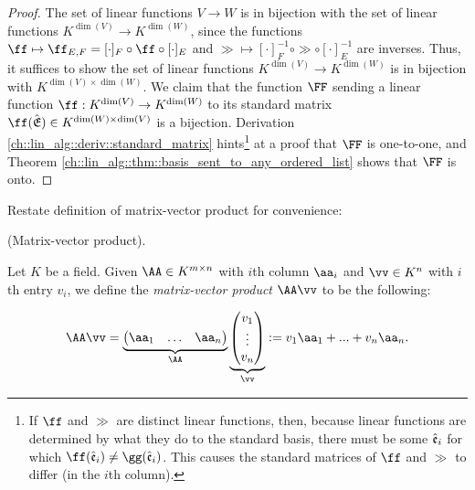 \begin{proof}
   The set of linear functions $V \rightarrow W$ is in bijection with the set of linear functions ${K^{\dim(V)} \rightarrow K^{\dim(W)}}$, since the functions $\ff \mapsto \ff_{E,F} = [\cdot]_F \circ \ff \circ [\cdot]_E$ and $\gg \mapsto [\cdot]_F^{-1} \circ \gg \circ [\cdot]_E^{-1}$ are inverses. Thus, it suffices to show the set of linear functions $K^{\dim(V)} \rightarrow K^{\dim(W)}$ is in bijection with $K^{\dim(V) \times \dim(W)}$. We claim that the function $\FF$ sending a linear function $\ff:K^{\dim(V)} \rightarrow K^{\dim(W)}$ to its standard matrix $\ff(\sE) \in K^{\dim(W) \times \dim(V)}$ is a bijection. Derivation \ref{ch::lin_alg::deriv::standard_matrix}  hints\footnote{If $\ff$ and $\gg$ are distinct linear functions, then, because linear functions are determined by what they do to the standard basis, there must be some $\hat{\mathfrak{e}}_i$ for which $\ff(\see_i) \neq \gg(\see_i)$. This causes the standard matrices of $\ff$ and $\gg$ to differ (in the $i$th column).} at a proof that $\FF$ is one-to-one, and Theorem \ref{ch::lin_alg::thm::basis_sent_to_any_ordered_list} shows that $\FF$ is onto.
\end{proof}

Restate definition of matrix-vector product for convenience:

\begin{defn}
    (Matrix-vector product).

    Let $K$ be a field. Given $\AA \in K^{m \times n}$ with $i$th column $\aa_i$ and $\vv \in K^n$ with $i$th entry $v_i$, we define the \textit{matrix-vector product} $\AA \vv$ to be the following:

    \begin{align*}
        \AA \vv =
        \underbrace
        {\begin{pmatrix} 
            \aa_1 & \hdots & \aa_n
        \end{pmatrix}}_\AA
        \underbrace{
        \begin{pmatrix} 
            v_1 \\ \vdots \\ v_n 
        \end{pmatrix}}_\vv
        :=
        v_1 \aa_1 + ... + v_n \aa_n.
    \end{align*}
\end{defn}

